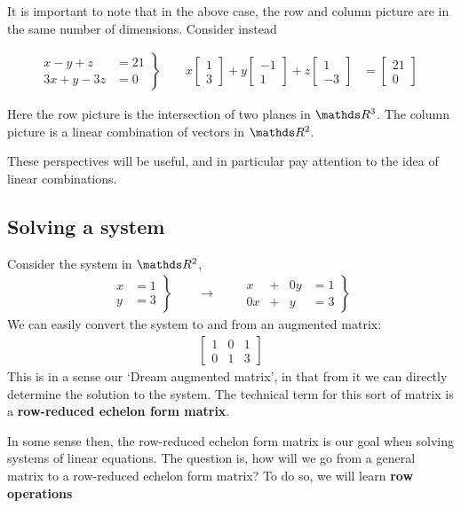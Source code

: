 \documentclass[11pt]{article}
\newcommand{\keyphrase}{\textbf}
\begin{document}
It is important to note that in the above case, the row and column picture are in the same number of dimensions. Consider instead

\begin{align*}
\left.
\begin{aligned}
x - y + z &= 21
\\
3x + y - 3z &= 0
\end{aligned}
\right\}
&&
\begin{aligned}
x \begin{bmatrix} 1 \\ 3\end{bmatrix}
+
y \begin{bmatrix} -1 \\ 1\end{bmatrix}
+
z \begin{bmatrix} 1 \\-3\end{bmatrix}
&=
\begin{bmatrix} 21 \\ 0\end{bmatrix}
\end{aligned}
\end{align*}

Here the row picture is the intersection of two planes in $\bbR^3$. The column picture is a linear combination of vectors in $\bbR^2$.

These perspectives will be useful, and in particular pay attention to the idea of linear combinations.

\subsection*{Solving a system}
Consider the system in $\bbR^2$,
\begin{align*}
\left.
\begin{aligned}
x &= 1
\\
y &= 3
\end{aligned}
\right\}
\qquad
\longrightarrow
\qquad
\left.
\begin{matrix}
x & + & 0y & = 1
\\
0x & + & y & = 3
\end{matrix}
\right\}
\end{align*}
We can easily convert the system to and from an augmented matrix:
\begin{align*}
\left[
\begin{matrix}
1 & 0 & 1
\\
0 & 1 & 3
\end{matrix}
\right]
\end{align*}
This is in a sense our `Dream augmented matrix', in that from it we can directly determine the solution to the system. The technical term for this sort of matrix is a \keyphrase{row-reduced echelon form matrix}.

In some sense then, the row-reduced echelon form matrix is our goal when solving systems of linear equations. The question is, how will we go from a general matrix to a row-reduced echelon form matrix? To do so, we will learn \keyphrase{row operations} 
\end{document}
